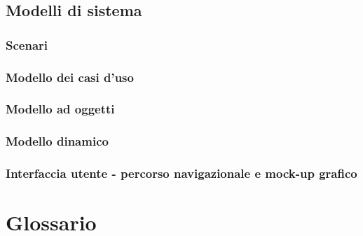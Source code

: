 \documentclass[12pt]{article}
\begin{document}
\subsection{Modelli di sistema}
\subsubsection{Scenari}
\subsubsection{Modello dei casi d'uso}
\subsubsection{Modello ad oggetti}
\subsubsection{Modello dinamico}
\subsubsection{Interfaccia utente - percorso navigazionale e mock-up grafico}
\section{Glossario}
\end{document}
